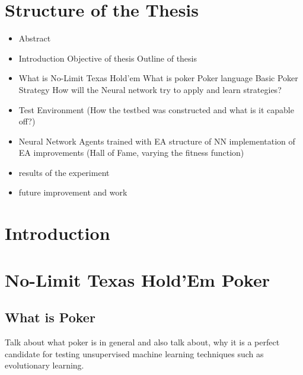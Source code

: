 



\newpage

\chapter{Structure of the Thesis}
\begin{itemize}
\item Abstract
\item Introduction
\subitem Objective of thesis
\subitem Outline of thesis
\item What is No-Limit Texas Hold'em
\subitem What is poker
\subitem Poker language
\subitem Basic Poker Strategy
\subitem How will the Neural network try to apply and learn strategies?
\item Test Environment (How the testbed was constructed and what is it capable off?)
\item Neural Network Agents trained with EA
\subitem structure of NN
\subitem implementation of EA
\subsubitem improvements (Hall of Fame, varying the fitness function)
\item results of the experiment
\item future improvement and work
\end{itemize}

\chapter{Introduction}

\chapter{No-Limit Texas Hold'Em Poker}
\section{What is Poker}
Talk about what poker is in general and also talk about, why it is a perfect candidate for testing unsupervised machine learning techniques such as evolutionary learning.
